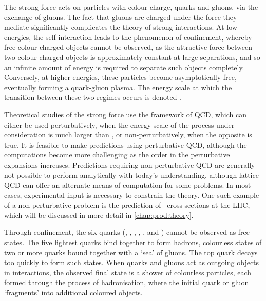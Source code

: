 \begin{table}
  \centering
  \caption{%
    Properties of the fundamental particles of the \acl{SM}~\cite{PDG2014}. The
    electric charge is given in units of the electron charge.
  }
  \label{tab:intro:sm:particles}
  
\end{table}

The strong force acts on particles with colour charge, quarks and gluons, via 
the exchange of gluons.
The fact that gluons are charged under the force they mediate significantly 
complicates the theory of strong interactions.
At low energies, the self interaction leads to the phenomenon of confinement, 
whereby free colour-charged objects cannot be observed, as the attractive force 
between two colour-charged objects is approximately constant at large 
separations, and so an infinite amount of energy is required to separate such 
objects completely.
Conversely, at higher energies, these particles become asymptotically free, 
eventually forming a quark-gluon plasma.
The energy scale at which the transition between these two regimes occurs is 
denoted \qcdscale.

Theoretical studies of the strong force use the framework of \ac{QCD}, which 
can either be used perturbatively, when the energy scale of the process under 
consideration is much larger than \qcdscale, or non-perturbatively, when the 
opposite is true.
It is feasible to make predictions using perturbative \ac{QCD}, although the 
computations become more challenging as the order in the perturbative 
expansions increases.
Predictions requiring non-perturbative \ac{QCD} are generally not possible to 
perform analytically with today's understanding, although lattice \ac{QCD} can 
offer an alternate means of computation for some problems.
In most cases, experimental input is necessary to constrain the theory.
One such example of a non-perturbative problem is the prediction of \pp\ 
cross-sections at the \ac{LHC}, which will be discussed in more detail in 
\cref{chap:prod:theory}.

Through confinement, the six quarks (\Pup, \Pdown, \Pcharm, \Pstrange, \Ptop, 
and \Pbottom) cannot be observed as free states.
The five lightest quarks bind together to form hadrons, colourless states of 
two or more quarks bound together with a `sea' of gluons.
The top quark decays too quickly to form such states.
When quarks and gluons act as outgoing objects in interactions, the observed 
final state is a shower of colourless particles, each formed through the 
process of hadronisation, where the initial quark or gluon `fragments' into 
additional coloured objects.

